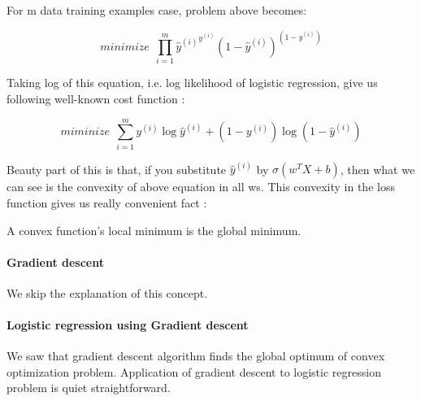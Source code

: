 For m data training examples case, problem above becomes: 

\begin{equation} 
    minimize \: \: \prod_{i = 1}^{m} {\hat{y}^{(i)}}^{y^{(i)}}{(1-\hat{y}^{(i)})}^{(1-y^{(i)})} 
\end{equation}

Taking log of this equation, i.e. log likelihood of logistic regression, give us following well-known cost function :

\begin{equation} \label{cost_function}
    miminize \: \: \sum_{i=1}^{m} y^{(i)}\log{{\hat{y}}^{(i)}} + (1-y^{(i)})\log{(1-{\hat{y}}^{(i)})}
\end{equation}

Beauty part of this is that, if you substitute $\hat{y}^{(i)}$ by $\sigma(w^TX + b)$, then what we can see is the convexity of above equation in all ws. This convexity in the loss function gives us really convenient fact : 

\begin{theorem}\label{thm:py}
A convex function's local minimum is the global minimum.
\end{theorem}

\paragraph{Gradient descent} We skip the explanation of this concept.

\paragraph{Logistic regression using Gradient descent} We saw that gradient descent algorithm finds the global optimum of convex optimization problem. Application of gradient descent to logistic regression problem is quiet straightforward. 



